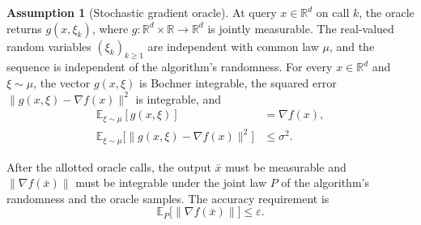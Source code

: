 \documentclass[10pt]{article}
\theoremstyle{definition}
\newtheorem{assumption}{Assumption}
\begin{document}
\begin{assumption}[Stochastic gradient oracle]
At query $x\in\mathbb{R}^d$ on call $k$, the oracle returns $g(x,\xi_k)$, where $g:\mathbb{R}^d\times\mathbb{R}\to\mathbb{R}^d$ is jointly measurable. The real-valued random variables $(\xi_k)_{k\geq 1}$ are independent with common law $\mu$, and the sequence is independent of the algorithm's randomness. For every $x\in\mathbb{R}^d$ and $\xi\sim\mu$, the vector $g(x,\xi)$ is Bochner integrable, the squared error $\|g(x,\xi)-\nabla f(x)\|^2$ is integrable, and
\[
\begin{aligned}
\mathbb{E}_{\xi\sim\mu}[g(x,\xi)] &= \nabla f(x),\\
\mathbb{E}_{\xi\sim\mu}\bigl[\|g(x,\xi)-\nabla f(x)\|^2\bigr] &\leq \sigma^2.
\end{aligned}
\]
\end{assumption}

After the allotted oracle calls, the output $\bar{x}$ must be measurable and $\|\nabla f(\bar{x})\|$ must be integrable under the joint law $P$ of the algorithm's randomness and the oracle samples. The accuracy requirement is
\[
\mathbb{E}_{P}\bigl[\|\nabla f(\bar{x})\|\bigr]\leq\varepsilon.
\]
\end{document}
